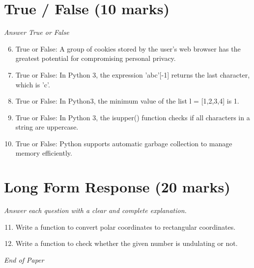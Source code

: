\documentclass[12pt]{article}
\begin{document}
\section*{True / False (10 marks)}
\textit{Answer True or False}
\begin{enumerate}[label=\arabic*.]
\setcounter{enumi}{5}
\item True or False: A group of cookies stored by the user's web browser has the greatest potential for compromising personal privacy.
\item True or False: In Python 3, the expression 'abc'[-1] returns the last character, which is 'c'.
\item True or False: In Python3, the minimum value of the list l = [1,2,3,4] is 1.
\item True or False: In Python 3, the isupper() function checks if all characters in a string are uppercase.
\item True or False: Python supports automatic garbage collection to manage memory efficiently.
\end{enumerate}

\section*{Long Form Response (20 marks)}
\textit{Answer each question with a clear and complete explanation.}
\begin{enumerate}[label=\arabic*.]
\setcounter{enumi}{10}
\item Write a function to convert polar coordinates to rectangular coordinates.
\item Write a function to check whether the given number is undulating or not.
\end{enumerate}

\vfill
\noindent\textit{End of Paper}
\end{document}
